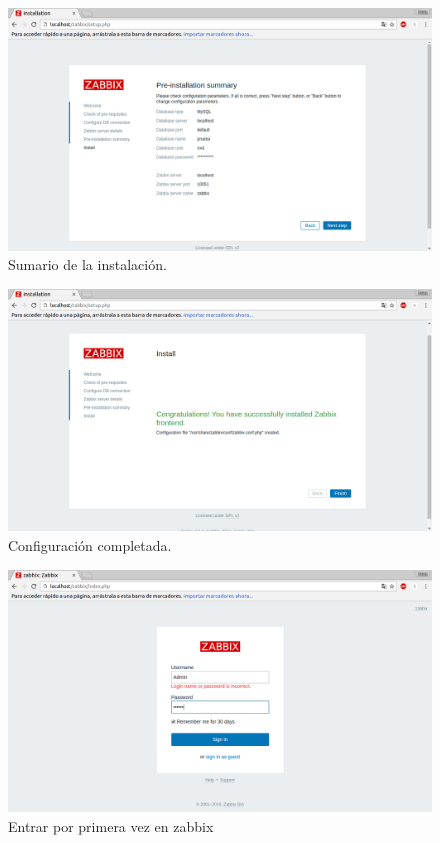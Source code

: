 \begin{itemize}
	\begin{figure}[H]
	\centering
	\includegraphics[width=0.7\linewidth]{zabbix5}
	\caption[zabbix5]{Sumario de la instalación.}
	\label{fig:zabbix5}
	\end{figure}
	
	\begin{figure}[H]
	\centering
	\includegraphics[width=0.7\linewidth]{zabbix6}
	\caption[zabbix6]{Configuración completada.}
	\label{fig:zabbix6}
	\end{figure}
	
	\begin{figure}[H]
	\centering
	\includegraphics[width=0.7\linewidth]{zabbix7}
	\caption[zabbix7]{Entrar por primera vez en zabbix}
	\label{fig:zabbix7}
	\end{figure}
	

\end{itemize}
